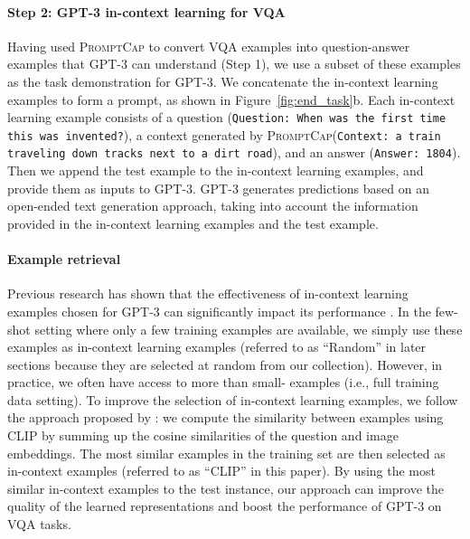 \documentclass[10pt,twocolumn,letterpaper]{article}
\newcommand{\NAME}{\textsc{PromptCap}\xspace}
\begin{document}
\paragraph{Step 2: GPT-3 in-context learning for VQA}
Having used \NAME to convert VQA examples into question-answer examples that GPT-3 can understand (Step 1), 
we use a subset of these examples as the task demonstration for GPT-3. We concatenate the in-context learning examples to form a prompt, as shown in Figure~\ref{fig:end_task}b. Each in-context learning example consists of a question (\texttt{Question: When was the first time this was invented?}), a context generated by \NAME (\texttt{Context: a train traveling down tracks next to a dirt road}), and an answer (\texttt{Answer: 1804}). Then we append the test example to the in-context learning examples, and provide them as inputs to GPT-3. GPT-3 generates predictions based on an open-ended text generation approach, taking into account the information provided in the in-context learning examples and the test example.

\vspace{-0.1in}
\paragraph{Example retrieval}
\label{sec:icl:retrieval}
Previous research has shown that the effectiveness of in-context learning examples chosen for GPT-3 can significantly impact its performance \cite{liu-etal-2022-makes}. In the few-shot setting where only a few training examples are available, we simply use these examples as in-context learning examples (referred to as ``Random'' in later sections because they are selected at random from our collection). 
However, in practice, we often have access to more than small- examples (i.e., full training data setting). To improve the selection of in-context learning examples, we follow the approach proposed by \cite{yang2022empirical}:  we compute the similarity between examples using CLIP \cite{radford2021learning} by summing up the cosine similarities of the question and image embeddings. The  most similar examples in the training set are then selected as in-context examples (referred to as ``CLIP'' in this paper). By using the most similar in-context examples to the test instance, our approach can improve the quality of the learned representations and boost the performance of GPT-3 on VQA tasks.
\end{document}
